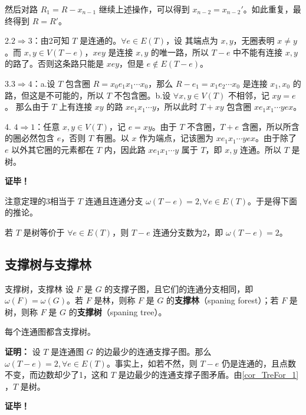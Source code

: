 然后对路 $R_1=R-x_{n-1}$ 继续上述操作，可以得到 $x_{n-2}=x_{n-2}'$。如此重复，最终得到 $R=R'$。

2.$2\Rightarrow 3$：由2可知 $T$ 是连通的。$\forall e\in E(T)$，设 其端点为 $x,y$，无圈表明 $x\neq y$。而 $x,y\in V(T-e)$，$xey$ 是连接 $x,y$ 的唯一路，所以 $T-e$ 中不能有连接 $x,y$ 的路了。否则这条路只能是 $xey$，但是 $e\not\in E(T-e)$。

3.$3\Rightarrow 4$：a.设 $T$ 包含圈 $R=x_0e_1x_1\cdots x_0$，那么 $R-e_1=x_1e_2\cdots x_0$ 是连接 $x_1,x_0$ 的路，但这是不可能的，所以 $T$ 不包含圈。b.设 $\forall x,y\in V(T)$ 不相邻，记 $xy=e$。 那么由于 $T$ 上有连接 $xy$ 的路 $xe_1x_1\cdots y$，所以此时 $T+xy$ 包含圈 $xe_1x_1\cdots yex$。 

4. $4\Rightarrow 1$：任意 $x,y\in V(T)$，记 $e=xy$。由于 $T$ 不含圈，$T+e$ 含圈，所以所含的圈必然包含 $e$，否则 $T$ 有圈。以 $x$ 作为端点，记该圈为 $xe_1x_1\cdots yex$。由于除了 $e$ 以外其它圈的元素都在 $T$ 内，因此路 $x e_1x_1\cdots y$ 属于 $T$，即 $x,y$ 连通。所以 $T$ 是树。 

\textbf{证毕！}

注意定理的3相当于 $T$ 连通且连通分支 $\omega(T-e)=2,\forall e\in E(T)$。于是得下面的推论。
\begin{corollary}{}\label{cor_TreFor_1}
若 $T$ 是树等价于 $\forall e\in E(T)$，则 $T-e$ 连通分支数为2，即 $\omega(T-e)=2$。
\end{corollary}



\subsection{支撑树与支撑林}

\begin{definition}{支撑树，支撑林}
设 $F$ 是 $G$ 的支撑子图，且它们的连通分支相同，即 $\omega(F)=\omega(G)$。若 $F$ 是林，则称 $F$ 是 $G$ 的\textbf{支撑林}（spaning forest）；若 $F$ 是树，则称 $F$ 是 $G$ 的\textbf{支撑树}（spaning tree）。
\end{definition}

\begin{theorem}{}
每个连通图都含支撑树。
\end{theorem}
\textbf{证明：}
设 $T$ 是连通图 $G$ 的边最少的连通支撑子图。那么 $\omega(T-e)=2,\forall e\in E(T)$。事实上，如若不然，则 $T-e$ 仍是连通的，且点数不变，而边数却少了1，这和 $T$ 是边最少的连通支撑子图矛盾。由\autoref{cor_TreFor_1} ，$T$ 是树。

\textbf{证毕！}

















